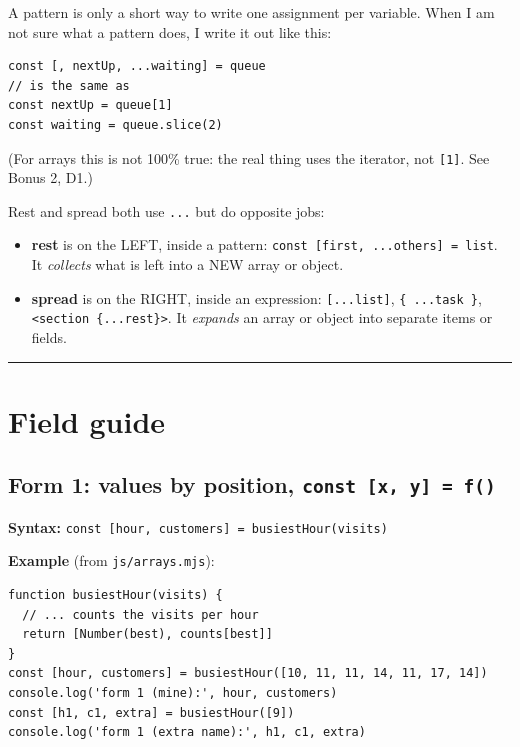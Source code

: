 A pattern is only a short way to write one assignment per variable.
When I am not sure what a pattern does, I write it out like this:

\begin{lstlisting}
const [, nextUp, ...waiting] = queue
// is the same as
const nextUp = queue[1]
const waiting = queue.slice(2)
\end{lstlisting}

(For arrays this is not 100\% true: the real thing uses the iterator, not \passthrough{\lstinline![1]!}. See Bonus 2, D1.)

Rest and spread both use \passthrough{\lstinline!...!} but do opposite jobs:

\begin{itemize}
\tightlist
\item
  \textbf{rest} is on the LEFT, inside a pattern: \passthrough{\lstinline!const [first, ...others] = list!}. It \emph{collects} what is left into a NEW array or object.
\item
  \textbf{spread} is on the RIGHT, inside an expression: \passthrough{\lstinline![...list]!}, \passthrough{\lstinline!\{ ...task \}!}, \passthrough{\lstinline!<section \{...rest\}>!}. It \emph{expands} an array or object into separate items or fields.
\end{itemize}

\begin{center}\rule{0.5\linewidth}{0.5pt}\end{center}

\section{Field guide}\label{field-guide}

\subsection{\texorpdfstring{Form 1: values by position, \texttt{const\ {[}x,\ y{]}\ =\ f()}}{Form 1: values by position, const {[}x, y{]} = f()}}\label{form-1-values-by-position-const-x-y-f}

\textbf{Syntax:} \passthrough{\lstinline!const [hour, customers] = busiestHour(visits)!}

\textbf{Example} (from \passthrough{\lstinline!js/arrays.mjs!}):

\begin{lstlisting}
function busiestHour(visits) {
  // ... counts the visits per hour
  return [Number(best), counts[best]]
}
const [hour, customers] = busiestHour([10, 11, 11, 14, 11, 17, 14])
console.log('form 1 (mine):', hour, customers)
const [h1, c1, extra] = busiestHour([9])
console.log('form 1 (extra name):', h1, c1, extra)
\end{lstlisting}

